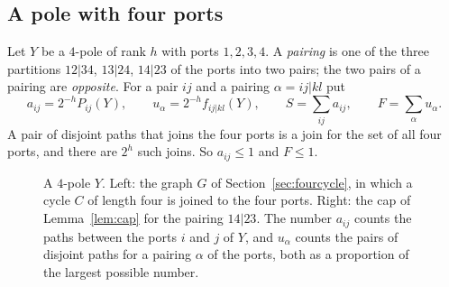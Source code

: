 \subsection{A pole with four ports}

Let $Y$ be a $4$-pole of rank $h$ with ports $1,2,3,4$. A \emph{pairing} is one of the three
partitions $12|34$, $13|24$, $14|23$ of the ports into two pairs; the two pairs of a pairing are
\emph{opposite}. For a pair $ij$ and a pairing $\alpha=ij|kl$ put
\[
  a_{ij}=2^{-h}P_{ij}(Y),\qquad u_\alpha=2^{-h}f_{ij|kl}(Y),\qquad
  S=\sum_{ij}a_{ij},\qquad F=\sum_\alpha u_\alpha .
\]
A pair of disjoint paths that joins the four ports is a join for the set of all four ports, and
there are $2^{h}$ such joins. So $a_{ij}\le1$ and $F\le1$.

\begin{figure}[ht]
\centering
{}
\caption{A $4$-pole $Y$. Left: the graph $G$ of Section~\ref{sec:fourcycle}, in which a cycle
$C$ of length four is joined to the four ports. Right: the cap of Lemma~\ref{lem:cap} for the
pairing $14|23$. The number $a_{ij}$ counts the paths between the ports $i$ and $j$ of $Y$, and
$u_\alpha$ counts the pairs of disjoint paths for a pairing $\alpha$ of the ports, both as a
proportion of the largest possible number.}
\label{fig:glue}
\end{figure}

